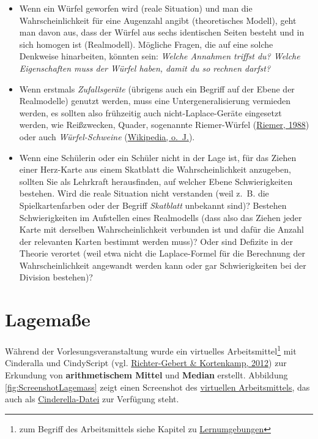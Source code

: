 \documentclass[
  ngerman,
]{scrbook}
\theoremstyle{definition}
\theoremstyle{definition}
\theoremstyle{definition}
\theoremstyle{definition}
\theoremstyle{remark}
\begin{document}
\begin{itemize}
\item
  Wenn ein Würfel geworfen wird (reale Situation) und man die Wahrscheinlichkeit für eine Augenzahl angibt (theoretisches Modell), geht man davon aus, dass der Würfel aus sechs identischen Seiten besteht und in sich homogen ist (Realmodell). Mögliche Fragen, die auf eine solche Denkweise hinarbeiten, könnten sein: \emph{Welche Annahmen triffst du? Welche Eigenschaften muss der Würfel haben, damit du so rechnen darfst?}
\item
  Wenn erstmals \emph{Zufallsgeräte} (übrigens auch ein Begriff auf der Ebene der Realmodelle) genutzt werden, muss eine Untergeneralisierung vermieden werden, es sollten also frühzeitig auch nicht-Laplace-Geräte eingesetzt werden, wie Reißzwecken, Quader, sogenannte Riemer-Würfel (\protect\hyperlink{ref-Riemer1988}{Riemer, 1988}) oder auch \emph{Würfel-Schweine} (\protect\hyperlink{ref-dewiki:214496187}{Wikipedia, o.~J.}).
\item
  Wenn eine Schülerin oder ein Schüler nicht in der Lage ist, für das Ziehen einer Herz-Karte aus einem Skatblatt die Wahrscheinlichkeit anzugeben, sollten Sie als Lehrkraft herausfinden, auf welcher Ebene Schwierigkeiten bestehen. Wird die reale Situation nicht verstanden (weil z.~B. die Spielkartenfarben oder der Begriff \emph{Skatblatt} unbekannt sind)? Bestehen Schwierigkeiten im Aufstellen eines Realmodells (dass also das Ziehen jeder Karte mit derselben Wahrscheinlichkeit verbunden ist und dafür die Anzahl der relevanten Karten bestimmt werden muss)? Oder sind Defizite in der Theorie verortet (weil etwa nicht die Laplace-Formel für die Berechnung der Wahrscheinlichkeit angewandt werden kann oder gar Schwierigkeiten bei der Division bestehen)?
\end{itemize}

\hypertarget{lagemauxdfe}{%
\section{Lagemaße}\label{lagemauxdfe}}

Während der Vorlesungsveranstaltung wurde ein virtuelles Arbeitsmittel\footnote{zum Begriff des Arbeitsmittels siehe Kapitel zu \protect\hyperlink{lernumgebungen}{Lernumgebungen}} mit Cinderalla und CindyScript (vgl. \protect\hyperlink{ref-Richter-Gebert2012}{Richter-Gebert \& Kortenkamp, 2012}) zur Erkundung von \textbf{arithmetischem Mittel} und \textbf{Median} erstellt. Abbildung \ref{fig:ScreenshotLagemass} zeigt einen Screenshot des \href{files/Stoffdidaktik-WiSe2122-AnhangE-Lagemasse.html}{virtuellen Arbeitsmittels}, das auch als \href{files/Stoffdidaktik-WiSe2122-AnhangE-Lagemasse.cdy}{Cinderella-Datei} zur Verfügung steht.
\end{document}
